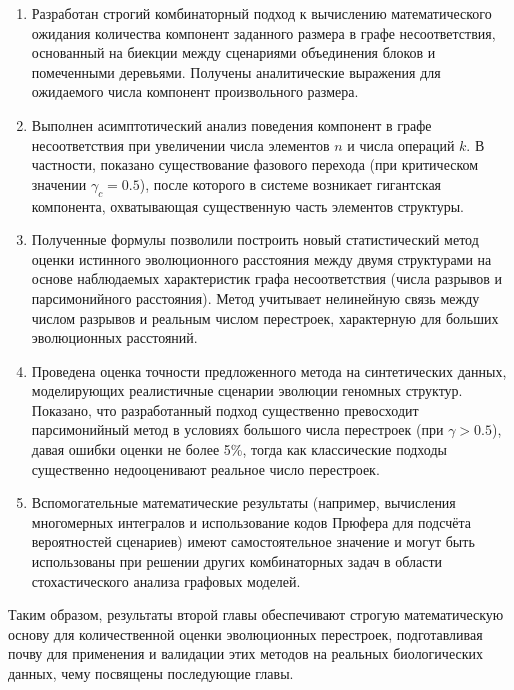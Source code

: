 \begin{enumerate}
    \item Разработан строгий комбинаторный подход к вычислению математического ожидания количества компонент заданного размера в графе несоответствия, основанный на биекции между сценариями объединения блоков и помеченными деревьями. Получены аналитические выражения для ожидаемого числа компонент произвольного размера.

    \item Выполнен асимптотический анализ поведения компонент в графе несоответствия при увеличении числа элементов $n$ и числа операций $k$. В частности, показано существование фазового перехода (при критическом значении $\gamma_c = 0.5$), после которого в системе возникает гигантская компонента, охватывающая существенную часть элементов структуры.

    \item Полученные формулы позволили построить новый статистический метод оценки истинного эволюционного расстояния между двумя структурами на основе наблюдаемых характеристик графа несоответствия (числа разрывов и парсимонийного расстояния). Метод учитывает нелинейную связь между числом разрывов и реальным числом перестроек, характерную для больших эволюционных расстояний.

    \item Проведена оценка точности предложенного метода на синтетических данных, моделирующих реалистичные сценарии эволюции геномных структур. Показано, что разработанный подход существенно превосходит парсимонийный метод в условиях большого числа перестроек (при $\gamma > 0.5$), давая ошибки оценки не более 5\%, тогда как классические подходы существенно недооценивают реальное число перестроек.

    \item Вспомогательные математические результаты (например, вычисления многомерных интегралов и использование кодов Прюфера для подсчёта вероятностей сценариев) имеют самостоятельное значение и могут быть использованы при решении других комбинаторных задач в области стохастического анализа графовых моделей.

\end{enumerate}

Таким образом, результаты второй главы обеспечивают строгую математическую основу для количественной оценки эволюционных перестроек, подготавливая почву для применения и валидации этих методов на реальных биологических данных, чему посвящены последующие главы.
